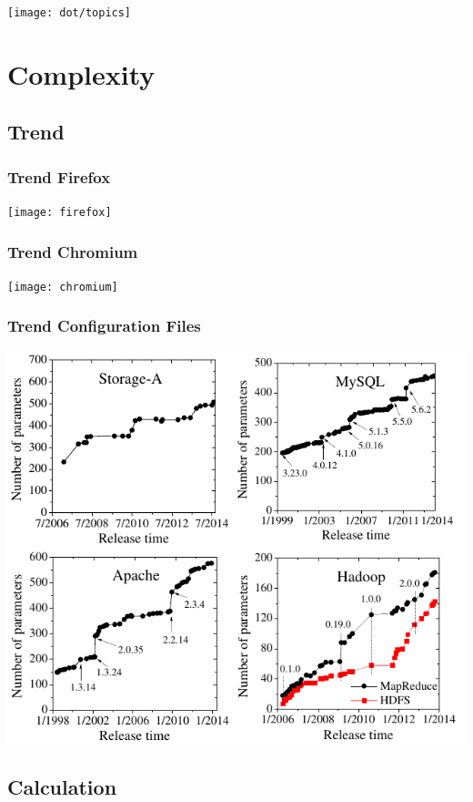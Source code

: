\documentclass{beamer}
\begin{document}
\begin{frame}
	\hspace*{-1cm}\texttt{[image: dot/topics]}
\end{frame}



\section{Complexity}

\subsection{Trend}

\begin{frame}
	\frametitle{Trend Firefox}
	\texttt{[image: firefox]}
\end{frame}

\begin{frame}
	\frametitle{Trend Chromium}
	\texttt{[image: chromium]}
\end{frame}

\begin{frame}
	\frametitle{Trend Configuration Files}
	\includegraphics[scale=0.5]{pics/trend.png}
	\citet{xu2015hey}
\end{frame}

\subsection{Calculation}
\end{document}
